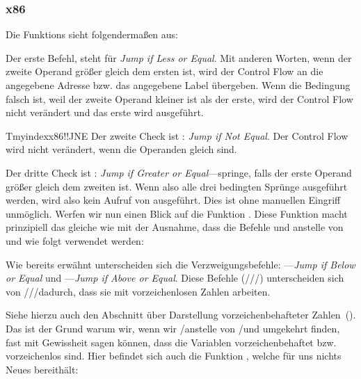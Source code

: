 \subsubsection{x86}


Die Funktions  sieht folgendermaßen aus:



Der erste Befehl, \JLE steht für \emph{Jump if Less or Equal}.
Mit anderen Worten, wenn der zweite Operand größer gleich dem ersten ist, wird der Control Flow an die angegebene
Adresse bzw. das angegebene Label übergeben.
Wenn die Bedingung falsch ist, weil der zweite Operand kleiner ist als der erste, wird der Control Flow nicht verändert
und das erste \printf wird ausgeführt.

Tmyindex{x86!\Instructions!JNE}
Der zweite Check ist \JNE: \emph{Jump if Not Equal}.
Der Control Flow wird nicht verändert, wenn die Operanden gleich sind.

Der dritte Check ist \JGE: \emph{Jump if Greater or Equal}---springe, falls der erste Operand größer gleich dem zweiten
ist.
Wenn also alle drei bedingten Sprünge ausgeführt werden, wird also kein Aufruf von \printf ausgeführt.
Dies ist ohne manuellen Eingriff unmöglich.
Werfen wir nun einen Blick auf die Funktion .
Diese Funktion macht prinzipiell das gleiche wie  mit der Ausnahme, dass die Befehle \JBE und \JAE
anstelle von \JLE und \JGE wie folgt verwendet werden:



Wie bereits erwähnt unterscheiden sich die Verzweigungsbefehle:
\JBE---\emph{Jump if Below or Equal} und \JAE---\emph{Jump if Above or Equal}.
Diese Befehle (\JA/\JAE/\JB/\JBE) unterscheiden sich von \JG/\JGE/\JL/\JLE dadurch, dass sie mit vorzeichenlosen Zahlen
arbeiten.

Siehe hierzu auch den Abschnitt über Darstellung vorzeichenbehafteter Zahlen~().
Das ist der Grund warum wir, wenn wir \JG/\JL anstelle von \JA/\JB und umgekehrt finden, fast mit Gewissheit sagen
können, dass die Variablen vorzeichenbehaftet bzw. vorzeichenlos sind.
Hier befindet sich auch die Funktion \main, welche für uns nichts Neues bereithält:

